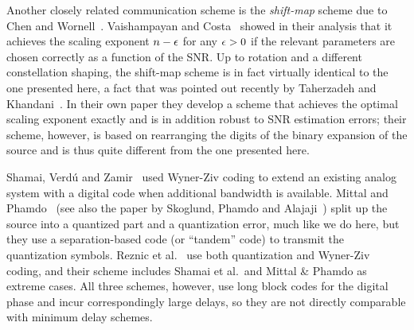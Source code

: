 Another closely related communication scheme is the \emph{shift-map} scheme due
to Chen and Wornell~\cite{ChenW1998}.  Vaishampayan and
Costa~\cite{VaishampayanC2003} showed in their analysis that it achieves the
scaling exponent $n-\epsilon$ for any $\epsilon > 0$ if the relevant parameters are chosen
correctly as a function of the SNR. Up to rotation and a different constellation
shaping, the shift-map scheme is in fact virtually identical to the one
presented here, a fact that was pointed out recently by Taherzadeh and
Khandani~\cite{TaherzadehK2008}. In their own paper they develop a scheme that
achieves the optimal scaling exponent exactly and is in addition robust to SNR
estimation errors; their scheme, however, is based on rearranging the digits of
the binary expansion of the source and is thus quite different from the one
presented here.

Shamai, Verd\'u and Zamir~\cite{ShamaiVZ1998} used Wyner-Ziv coding to extend an
existing analog system with a digital code when additional bandwidth is
available. Mittal and Phamdo~\cite{MittalP2002} (see also the paper by Skoglund,
Phamdo and Alajaji~\cite{SkoglundPA2002}) split up the source into a quantized
part and a quantization error, much like we do here, but they use a
separation-based code (or ``tandem'' code) to transmit the quantization symbols.
Reznic et al.~\cite{ReznicFZ2006} use both quantization and Wyner-Ziv coding,
and their scheme includes Shamai et al.\ and Mittal \& Phamdo as extreme cases.
All three schemes, however, use long block codes for the digital phase and incur
correspondingly large delays, so they are not directly comparable with minimum
delay schemes.
















